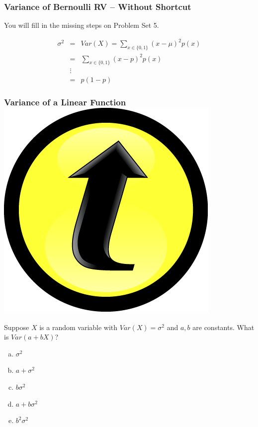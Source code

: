 \documentclass[handout]{beamer}
\begin{document}
\begin{frame}
\frametitle{Variance of Bernoulli RV -- Without Shortcut}

\alert{You will fill in the missing steps on Problem Set 5.}

\begin{eqnarray*}
	\sigma^2 &=& Var(X) = \sum_{x \in \{0,1\}} (x - \mu)^2 p(x)\\
	 &=& \sum_{x \in \{0,1\}} (x - p)^2 p(x)\\
	 &\vdots &\\ 
	 &=&p(1-p)
\end{eqnarray*}



\end{frame}

\begin{frame}
\frametitle{Variance of a Linear Function  \hfill \includegraphics[scale = 0.05]{./images/clicker} }
Suppose $X$ is a random variable with $Var(X) = \sigma^2$ and $a,b$ are constants. What is $Var(a + bX)$? 
\begin{enumerate}[(a)]
	\item $\sigma^2$
	\item $a + \sigma^2$
	\item $b \sigma^2$
	\item $a + b \sigma^2$
	\item $b^2 \sigma^2$
\end{enumerate}

\end{frame}
\end{document}
